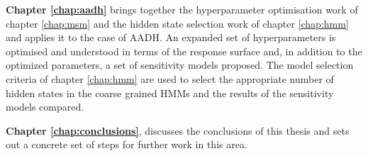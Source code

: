 \textbf{Chapter \ref{chap:aadh}} brings together the hyperparameter optimisation work of chapter  \ref{chap:msm} and the hidden state selection work of chapter \ref{chap:hmm} and applies it to the case of AADH. An expanded set of hyperparameters is optimised and understood in terms of the response surface and, in addition to the optimized parameters, a set of sensitivity models proposed. The model selection criteria of chapter \ref{chap:hmm} are used to select the appropriate number of hidden states in the coarse grained HMMs and the results of the sensitivity models compared. 

\textbf{Chapter \ref{chap:conclusions}}, discusses the conclusions of this thesis and sets out a concrete set of steps for further work in this area. 























